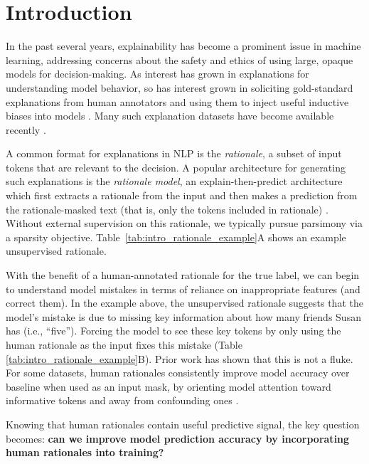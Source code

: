 




\section{Introduction}


In the past several years, explainability has become a prominent issue in machine learning, addressing concerns about the safety and ethics of using large, opaque models for decision-making. As interest has grown in explanations for understanding model behavior, so has interest grown in soliciting gold-standard explanations from human annotators and using them to inject useful inductive biases into models \cite{hase_when_2021}. Many such explanation datasets have become available recently \cite{wiegreffe_teach_2021}.

A common format for explanations in NLP is the \textit{rationale}, 
a subset of input tokens that are relevant to the decision.
A popular architecture for generating such explanations is the \textit{rationale model}, an explain-then-predict architecture which first 
extracts a rationale from the input and
then makes a prediction from 
the rationale-masked text (that is, only the tokens included in rationale) \cite{lei_rationalizing_2016, deyoung_eraser_2019}. Without  external supervision on this rationale, we typically pursue parsimony via a sparsity objective.
Table~\ref{tab:intro_rationale_example}A shows an example unsupervised rationale.

With the benefit of a human-annotated rationale for the true label, we can begin to understand model mistakes in terms of reliance on inappropriate features (and correct them). In the example above, the unsupervised rationale suggests that the model's mistake is due to missing key information about how many friends Susan has (i.e., ``five''). Forcing the model to see these key tokens by only using the human rationale as the input 
fixes this mistake (Table \ref{tab:intro_rationale_example}B). 
Prior work has shown that this is not a fluke. For some datasets, human rationales consistently improve model accuracy over baseline when used as an input mask, by orienting model attention toward informative tokens and away from confounding ones
\cite{carton_evaluating_2020}. 


Knowing that human rationales contain useful predictive signal, the key question becomes: \textbf{can we improve model prediction accuracy by incorporating human rationales into training?} 

